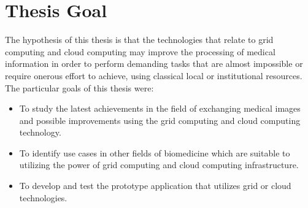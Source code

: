 \section{Thesis Goal}
\label{sec:goal}
The hypothesis of this thesis is that the technologies that relate to grid computing and cloud computing may improve the processing of medical information in order to perform demanding tasks that are almost impossible or require onerous effort to achieve, using classical local or institutional resources.
The particular goals of this thesis were:
\begin{itemize}
\item To study the latest achievements in the field of exchanging medical images and  possible improvements using the grid computing and cloud computing technology.
\item To identify use cases in other fields of biomedicine which are suitable to utilizing the power of grid computing and cloud computing infrastructure.
\item To develop and test the prototype application that utilizes grid or cloud technologies.
\end{itemize}
 
